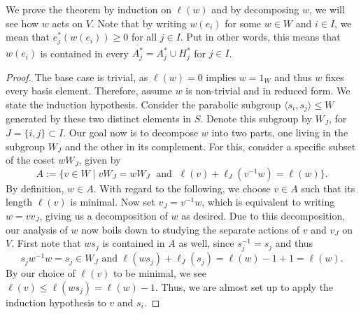 We prove the theorem by induction on \(\ell(w)\) and by decomposing \(w\), we will see how \(w\) acts on \(V\).
Note that by writing \(w(e_i)\) for some \(w\in W\) and \(i\in I\), we mean that \(e_j^*(w(e_i)) \geq 0\) for all \(j\in I\).
Put in other words, this means that \(w(e_i)\) is contained in every \(\overline{A_j^*} = A_j^* \cup H_j^*\) for \(j\in I\).
\begin{proof}
    The base case is trivial, as \(\ell(w) = 0\) implies \(w = 1_W\) and thus \(w\) fixes every basis element.
    Therefore, assume \(w\) is non-trivial and in reduced form.
    We state the induction hypothesis.
    Consider the parabolic subgroup \(\langle s_i, s_j\rangle\leq W\) generated by these two distinct elements in \(S\).
    Denote this subgroup by \(W_J\), for \(J=\{i,j\}\subset I\).
    Our goal now is to decompose \(w\) into two parts, one living in the subgroup \(W_J\) and the other in its complement.
    For this, consider a specific subset of the coset \(wW_J\), given by
    \[A:=\{v\in W \;\vert\; vW_J = wW_J \;\text{ and }\; \ell(v) + \ell_J(v^{-1}w) = \ell(w)\}.\]
    By definition, \(w\in A\).
    With regard to the following, we choose \(v\in A\) such that its length \(\ell(v)\) is minimal.
    Now set \(v_J = v^{-1}w\), which is equivalent to writing \(w = vv_J\), giving us a decomposition of \(w\) as desired.
    Due to this decomposition, our analysis of \(w\) now boils down to studying the separate actions of \(v\) and \(v_J\) on \(V\).
    First note that \(ws_j\) is contained in \(A\) as well, since \(s_j^{-1} = s_j\) and thus
    \[s_jw^{-1}w = s_j\in W_J \text{ and } \ell(ws_j) + \ell_J(s_j) = \ell(w) - 1 + 1 = \ell(w).\]
    By our choice of \(\ell(v)\) to be minimal, we see \(\ell(v)\leq \ell(ws_j) = \ell(w)-1\).
    Thus, we are almost set up to apply the induction hypothesis to \(v\) and \(s_i\).

\end{proof}
